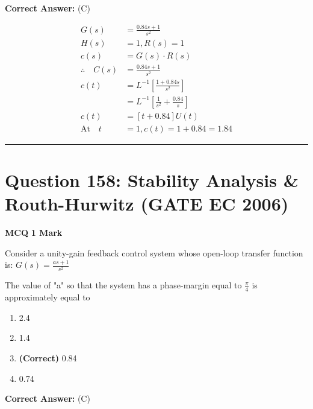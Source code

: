 \documentclass[11pt,a4paper]{article}
\begin{document}
\noindent \textbf{Correct Answer:} (C)

\begin{tcolorbox}[solbox, title=Detailed Solution -- Question 157]
\[
\begin{aligned} G(s)&=\frac{0.84 s+1}{s^{2}}\\ H(s) &=1, R(s)=1 \\ c(s) &=G(s) \cdot R(s) \\ \therefore \quad C(s) &=\frac{0.84 s+1}{s^{2}} \\ c(t) &=L^{-1}\left[\frac{1+0.84 s}{s^{2}}\right] \\ &=L^{-1}\left[\frac{1}{s^{2}}+\frac{0.84}{s}\right] \\ c(t) &=[t+0.84] U(t) \\ \text{At}\quad t &=1, c(t)=1+0.84=1.84 \end{aligned}
\]
\end{tcolorbox}

\vspace{1.5em}
\hrule
\vspace{1.5em}

\section*{Question 158: Stability Analysis \& Routh-Hurwitz (GATE EC 2006)}
\noindent \textbf{\color{primary}MCQ} \hfill \textbf{\color{secondary}1 Mark}


\noindent Consider a unity-gain feedback control system whose open-loop transfer function is: 
$G(s)=\frac{as+1}{s^{2}}$ 

The value of "a" so that the system has a phase-margin equal to $\frac{\pi }{4}$ is approximately equal to


\begin{enumerate}[label=(\Alph*)]
    \item 2.4
    \item 1.4
    \item \textbf{(Correct)} 0.84
    \item 0.74
\end{enumerate}

\noindent \textbf{Correct Answer:} (C)
\end{document}
